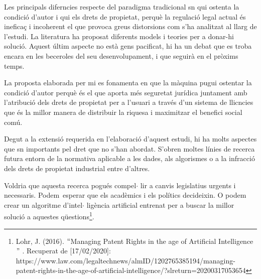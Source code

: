 \documentclass[12pt]{article}
\renewcommand{\_}{\kern-1.5pt\textunderscore\kern-1.5pt}
\begin{document}
\begin{itemize}
\vspace{\baselineskip}
\begin{justify}
Les principals diferncies respecte del paradigma tradicional sn qui ostenta la condició d’autor i qui els drets de propietat,  perquè la regulació legal actual és ineficaç i incoherent el que provoca greus distorsions com s’ha analitzat al llarg de l’estudi. La literatura ha proposat diferents models i teories per a donar-hi solució. Aquest últim aspecte no està gens pacificat, hi ha un debat que es troba encara en les beceroles del seu desenvolupament, i que seguirà en el pròxims temps. 
\end{justify}\par


\vspace{\baselineskip}
\begin{justify}
La proposta elaborada per mi es fonamenta en que la màquina pugui ostentar la condició d’autor perquè és el que aporta més seguretat jurídica juntament amb l’atribució dels drets de propietat per a l’usuari a través d’un sistema de llicncies que és la millor manera de distribuir la riquesa i maximitzar el benefici social comú.
\end{justify}\par


\vspace{\baselineskip}
\begin{justify}
Degut a la extensió requerida en l’elaboració d’aquest estudi, hi ha molts aspectes que sn importants pel dret que no s’han abordat. S’obren moltes línies de recerca futura entorn de la normativa aplicable a les dades, als algorismes o a la infracció dels drets de propietat industrial entre d’altres.
\end{justify}\par


\vspace{\baselineskip}
\begin{justify}
Voldria que aquesta recerca pogués compel$ \cdot $ lir a canvis legislatius urgents i necessaris. Podem\ esperar  que els acadèmics i els polítics decideixin. O podem crear un algoritme d’intel$ \cdot $ ligència artificial entrenat per a buscar la millor solució a aquestes qüestions\footnote{ Lohr, J. (2016). $``$Managing Patent Rights in the age of Artificial Intelligence$"$ . Recuperat de [17/02/2020]: https://www.law.com/legaltechnews/almID/1202765385194/managing-patent-rights-in-the-age-of-artificial-intelligence/?slreturn=20200317053654 }. 
\end{justify}\par



\end{itemize}
\end{document}
